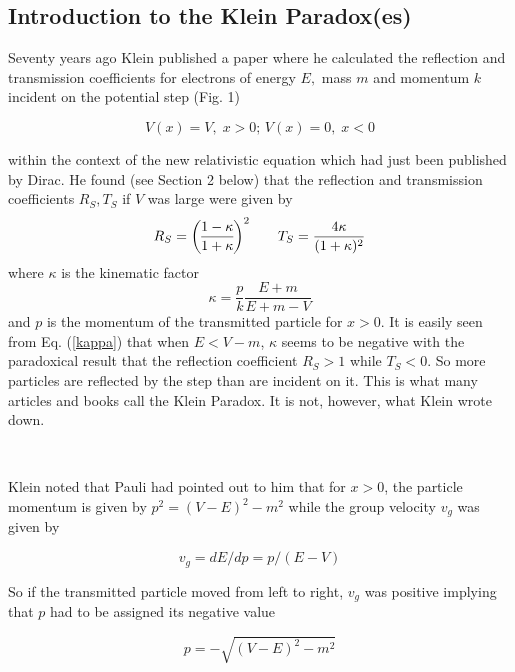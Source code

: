 \subsection{Introduction to the Klein Paradox(es)}

\noindent Seventy years ago Klein \cite{klein} published a paper where he
calculated the reflection and transmission coefficients for electrons of
energy $E,$ mass $m$ and momentum $k$ incident on the potential step (Fig. 1)

\begin{equation}  \label{step}
V(x)=V,\;x>0;\,V(x)=0,\;x<0
\end{equation}

\noindent within the context of the new relativistic equation which had just
been published by Dirac\cite{dirac}. He found (see Section 2 below) that the
reflection and transmission coefficients $R_S,T_S$ if $V$ was large were
given by 
\begin{equation}
R_S=%
{\displaystyle {1-\kappa  \overwithdelims() 1+\kappa }}
^2\qquad T_S=\frac{4\kappa }{(1+\kappa )^2}  \label{Rs/Ts}
\end{equation}
\noindent where $\kappa $ is the kinematic factor 
\begin{equation}
\kappa =\frac pk\frac{E+m}{E+m-V}  \label{kappa}
\end{equation}
\noindent and $p$ is the momentum of the transmitted particle for $x>0.$ It
is easily seen from Eq. (\ref{kappa}) that when $E<V-m$, $\kappa $ seems to
be negative with the paradoxical result that the reflection coefficient $%
R_S>1$ while $T_S<0$. So more particles are reflected by the step than are
incident on it. This is what many articles and books call the Klein Paradox.
It is not, however, what Klein wrote down.

\smallskip\ 

\noindent Klein noted that Pauli had pointed out to him that for $x>0$, the
particle momentum is given by $p^2=(V-E)^2-m^2$ while the group velocity $%
v_g $ was given by

\begin{equation}  \label{group}
v_g=dE/dp=p/(E-V)
\end{equation}

\noindent So if the transmitted particle moved from left to right, $v_g$ was
positive implying that $p$ had to be assigned its negative value

\begin{equation}  \label{neg}
p=-\sqrt{(V-E)^2-m^2}
\end{equation}

